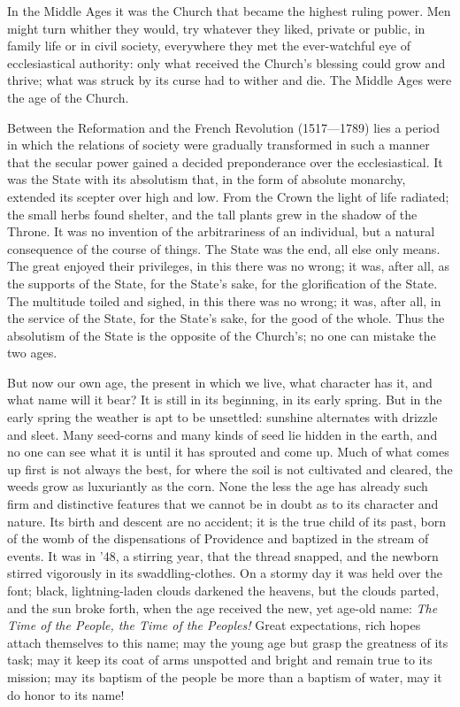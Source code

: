 \documentclass[12pt,a4paper,openany]{book}
\newcommand{\opage}[1]{\marginnote{\footnotesize\textit{[#1]}}}
\begin{document}
In the Middle Ages it was the Church that became the
\setcounter{footnote}{0}%
\opage{5}highest ruling power. Men might turn whither
they would, try whatever they liked, private
or public, in family life or in civil society,
everywhere they met the ever-watchful eye of ecclesiastical authority:
only what received the Church's blessing
could grow and thrive; what was struck by its
curse had to wither and die. The Middle Ages were
the age of the Church.

Between the Reformation and the French Revolution
(1517---1789) lies a period in which the relations of society
were gradually transformed in such
a manner that the secular power gained a decided preponderance
over the ecclesiastical. It was the State with its absolutism
that, in the form of absolute monarchy, extended
its scepter over high and low. From the Crown
the light of life radiated; the small herbs found shelter, and the
tall plants grew in the shadow of the Throne. It was no
invention of the arbitrariness of an individual, but a natural
consequence of the course of things. The State was the end, all else
only means. The great enjoyed their privileges, in this
there was no wrong; it was, after all, as the supports of the State,
for the State's sake, for the glorification of the State. The multitude
toiled and sighed, in this there was no wrong; it was, after all, in
the service of the State, for the State's sake, for the good of the whole.
Thus the absolutism of the State is the opposite of the Church's; no one
can mistake the two ages.

But now our own age, the present in which we
live, what character has it, and what name will
it bear? It is still in its beginning, in its early
spring. But in the early spring the weather is
apt to be unsettled: sunshine alternates with drizzle and sleet.
Many seed-corns and many kinds of seed lie hidden in
\setcounter{footnote}{0}%
\opage{6}the earth, and no one can see what it is until it has
sprouted and come up. Much of what comes up
first is not always the best, for where the soil
is not cultivated and cleared, the weeds grow
as luxuriantly as the corn. None the less the age has
already such firm and distinctive features that
we cannot be in doubt as to its character and
nature. Its birth and descent are no accident;
it is the true child of its past, born of the womb of the dispensations
of Providence and baptized in the stream of events. It was
in '48, a stirring year, that the thread snapped, and the newborn
stirred vigorously in its swaddling-clothes. On a stormy day
it was held over the font; black, lightning-laden clouds
darkened the heavens, but the clouds parted, and the sun broke
forth, when the age received the new, yet age-old name: \emph{The Time of the People, the Time of the Peoples!} Great expectations,
rich hopes attach themselves to this
name; may the young age but grasp the greatness
of its task; may it keep its coat of arms unspotted
and bright and remain true to its mission; may its baptism of the people
be more than a baptism of water, may it do
honor to its name!
\end{document}
